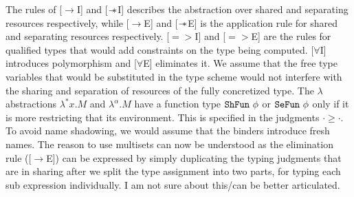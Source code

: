 The rules of [$\rightarrow$I] and [$\mathrel{-\mkern-6mu*}$I] describes the abstraction over shared and
separating resources respectively, while [$\rightarrow$E] and [$\mathrel{-\mkern-6mu*}$E] is the application
rule for shared and separating resources respectively. [$=>$I] and [$=>$E] are the rules for
qualified types that would add constraints on the type being computed. [$\forall$I] introduces
polymorphism and [$\forall$E] eliminates it. We assume that the free type variables that
would be substituted in the type scheme would not interfere with the sharing and separation
of resources of the fully concretized type. The $\lambda$ abstractions $\lambda^{*} x. M$ and $\lambda^{\alpha}.M$
have a function type $\texttt{ShFun}\ \phi$ or $\texttt{SeFun}\ \phi$ only if it is more restricting that its environment.
This is specified in the judgments $\cdot \geq \cdot$. To avoid name shadowing, we would assume that
the binders introduce fresh names. The reason to use multisets can now be understood
as the elimination rule ([$\rightarrow$E]) can be expressed by simply duplicating the typing
judgments that are in sharing after we split the type assignment into two parts,
for typing each sub expression individually.{\color{red} I am not sure about this/can be better articulated}.
